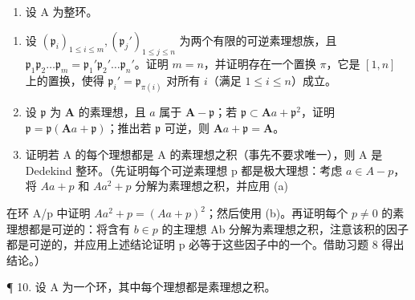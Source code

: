 \begin{enumerate}
\def\labelenumi{\arabic{enumi}.}
\setcounter{enumi}{8}
\tightlist
\item
  设 A 为整环。
\end{enumerate}

\begin{enumerate}
\def\labelenumi{(\alph{enumi})}
\item
  设 \((\mathfrak{p}_i)_{1\leqslant i\leqslant m},(\mathfrak{p}_j')_{1\leqslant j\leqslant n}\) 为两个有限的可逆素理想族，且 \(\mathfrak{p}_1\mathfrak{p}_2\dots \mathfrak{p}_m = \mathfrak{p}_1'\mathfrak{p}_2'\dots \mathfrak{p}_n'\)。证明 \(m = n\)，并证明存在一个置换 \(\pi\)，它是 \([1,n]\) 上的置换，使得 \(\mathfrak{p}_i' = \mathfrak{p}_{\pi (i)}\) 对所有 \(i\)（满足 \(1\leqslant i\leqslant n\)）成立。
\item
  设 \(\mathfrak{p}\) 为 \(\mathbf{A}\) 的素理想，且 \(a\) 属于 \(\mathbf{A} - \mathfrak{p}\)；若 \(\mathfrak{p} \subset \mathbf{A}a + \mathfrak{p}^2\)，证明 \(\mathfrak{p} = \mathfrak{p}(\mathbf{A}a + \mathfrak{p})\)；推出若 \(\mathfrak{p}\) 可逆，则 \(\mathbf{A}a + \mathfrak{p} = \mathbf{A}\)。
\item
  证明若 A 的每个理想都是 A 的素理想之积（事先不要求唯一），则 A 是 Dedekind 整环。（先证明每个可逆素理想 p 都是极大理想：考虑 \(a \in A - p\)，将 \(Aa + p\) 和 \(Aa^{2} + p\) 分解为素理想之积，并应用 (a)
\end{enumerate}

在环 A/p 中证明 \(Aa^{2} + p = (Aa + p)^{2}\)；然后使用 (b)。再证明每个 \(p \neq 0\) 的素理想都是可逆的：将含有 \(b \in p\) 的主理想 Ab 分解为素理想之积，注意该积的因子都是可逆的，并应用上述结论证明 p 必等于这些因子中的一个。借助习题 8 得出结论。）

¶ 10. 设 A 为一个环，其中每个理想都是素理想之积。

